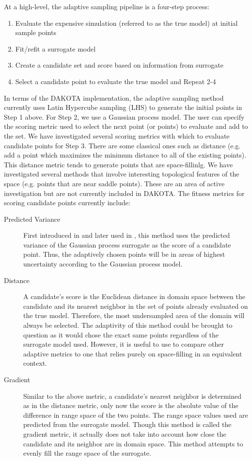 At a high-level, the adaptive sampling pipeline is a four-step process:
\begin{enumerate}
\item Evaluate the expensive simulation (referred to as the true model) at
initial sample points
\item Fit/refit a surrogate model
\item Create a candidate set and score based on information from surrogate
\item Select a candidate point to evaluate the true model and Repeat 2-4
\end{enumerate}

In terms of the DAKOTA implementation, the adaptive sampling method 
currently uses Latin Hypercube sampling (LHS) to generate the initial 
points in Step 1 above.  For Step 2, we use a Gaussian process model. 
The user can specify the scoring metric used to select the 
next point (or points) to evaluate and add to the set.  
We have investigated several scoring metrics with which to evaluate 
candidate points for Step 3.  There are some classical ones such as distance 
(e.g. add a point which maximizes the minimum distance to all of 
the existing points).  This distance metric tends to generate 
points that are space-fillinlg.  We have investigated several 
methods that involve interesting topological features of the 
space (e.g. points that are near saddle points).  These are 
an area of active investigation but are not currently included 
in DAKOTA.  The fitness metrics for scoring 
candidate points currently include: 
\begin{description}
\item[Predicted Variance]
First introduced in \cite{MacKay} and later
used in \cite{Seo}, this method uses the predicted
variance of the Gaussian process surrogate as the score of a candidate 
point. Thus, the adaptively chosen points will be in areas of highest 
uncertainty according to the Gaussian process model.
\item[Distance]
A candidate's score is the Euclidean distance in domain space between the
candidate and its nearest neighbor in the set of points already evaluated on the
true model. Therefore, the most undersampled area of the domain will always be
selected. The adaptivity of this method could be brought to question as it would
chose the exact same points regardless of the surrogate model used. However, it
is useful to use to compare other adaptive metrics to one that relies purely on
space-filling in an equivalent context.
\item[Gradient]
Similar to the above metric, a candidate's nearest neighbor is determined as in
the distance metric, only now the score is the absolute value of the difference
in range space of the two points.  The range space values used are predicted
from the surrogate model. Though this method is called the gradient metric, it
actually does not take into account how close the candidate and its neighbor are
in domain space. This method attempts to evenly fill the range space of the
surrogate.
\end{description}

